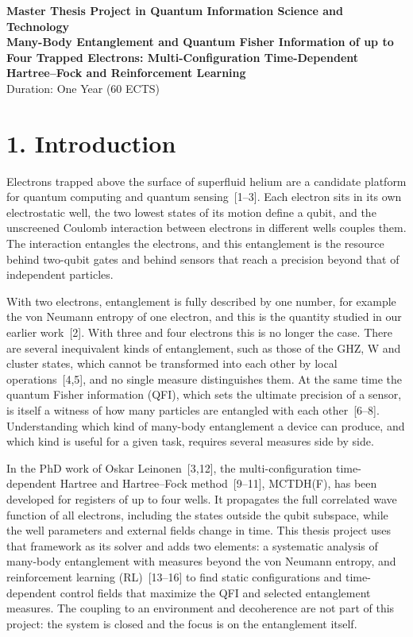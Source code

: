 \documentclass[12pt,a4paper]{article}
\begin{document}
\begin{center}
    {\Large \textbf{Master Thesis Project in Quantum Information Science and Technology}}\\[0.3cm]
    {\large \textbf{Many-Body Entanglement and Quantum Fisher Information of up to Four Trapped Electrons: Multi-Configuration Time-Dependent Hartree--Fock and Reinforcement Learning}}\\[0.2cm]
    \vspace{0.3cm}
    {Duration: One Year (60 ECTS)}
\end{center}

\vspace{1cm}

\section*{1. Introduction}

Electrons trapped above the surface of superfluid helium are a
candidate platform for quantum computing and quantum sensing~[1--3].
Each electron sits in its own electrostatic well, the two lowest
states of its motion define a qubit, and the unscreened Coulomb
interaction between electrons in different wells couples them.  The
interaction entangles the electrons, and this entanglement is the
resource behind two-qubit gates and behind sensors that reach a
precision beyond that of independent particles.

With two electrons, entanglement is fully described by one number,
for example the von Neumann entropy of one electron, and this is the
quantity studied in our earlier work~[2].  With three and four
electrons this is no longer the case.  There are several inequivalent
kinds of entanglement, such as those of the GHZ, W and cluster states,
which cannot be transformed into each other by local operations~[4,5],
and no single measure distinguishes them.  At the same time the
quantum Fisher information (QFI), which sets the ultimate precision of
a sensor, is itself a witness of how many particles are entangled with
each other~[6--8].  Understanding which kind of many-body entanglement
a device can produce, and which kind is useful for a given task,
requires several measures side by side.

In the PhD work of Oskar Leinonen~[3,12], the multi-configuration
time-dependent Hartree and Hartree--Fock method~[9--11], MCTDH(F), has
been developed for registers of up to four wells.  It propagates
the full correlated wave function of all electrons, including the
states outside the qubit subspace, while the well parameters and
external fields change in time.  This thesis project uses that
framework as its solver and adds two elements: a systematic analysis
of many-body entanglement with measures beyond the von Neumann
entropy, and reinforcement learning (RL)~[13--16] to find static
configurations and time-dependent control fields that maximize the
QFI and selected entanglement measures.  The coupling to an
environment and decoherence are not part of this project: the system
is closed and the focus is on the entanglement itself.
\end{document}
